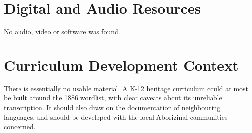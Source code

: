 \documentclass[12pt]{article}
\begin{document}
\section{Digital and Audio Resources}
No audio, video or software was found.

\section{Curriculum Development Context}
There is essentially no usable material. A K-12 heritage curriculum could at most be built around the 1886 wordlist, with clear caveats about its unreliable transcription. It should also draw on the documentation of neighbouring languages, and should be developed with the local Aboriginal communities concerned.
\end{document}
